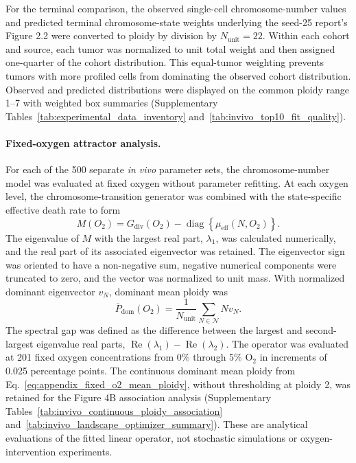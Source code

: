\documentclass[11pt]{article}
\begin{document}
For the terminal comparison, the observed single-cell chromosome-number values and predicted terminal chromosome-state weights underlying the seed-25 report's Figure 2.2 were converted to ploidy by division by \(N_{\mathrm{unit}}=22\). Within each cohort and source, each tumor was normalized to unit total weight and then assigned one-quarter of the cohort distribution. This equal-tumor weighting prevents tumors with more profiled cells from dominating the observed cohort distribution. Observed and predicted distributions were displayed on the common ploidy range 1--7 with weighted box summaries (Supplementary Tables~\ref{tab:experimental_data_inventory} and~\ref{tab:invivo_top10_fit_quality}).

\paragraph{Fixed-oxygen attractor analysis.}
For each of the 500 separate \textit{in vivo} parameter sets, the chromosome-number model was evaluated at fixed oxygen without parameter refitting. At each oxygen level, the chromosome-transition generator was combined with the state-specific effective death rate to form
\begin{equation}
M(O_2)=G_{\mathrm{div}}(O_2)-\operatorname{diag}\!\left\{\mu_{\mathrm{eff}}(N,O_2)\right\}.
\label{eq:appendix_fixed_o2_operator}
\end{equation}
The eigenvalue of $M$ with the largest real part, $\lambda_1$, was calculated numerically, and the real part of its associated eigenvector was retained. The eigenvector sign was oriented to have a non-negative sum, negative numerical components were truncated to zero, and the vector was normalized to unit mass. With normalized dominant eigenvector $v_N$, dominant mean ploidy was
\begin{equation}
\overline P_{\mathrm{dom}}(O_2)=\frac{1}{N_{\mathrm{unit}}}\sum_{N\in\mathcal N}Nv_N.
\label{eq:appendix_fixed_o2_mean_ploidy}
\end{equation}
The spectral gap was defined as the difference between the largest and second-largest eigenvalue real parts, $\operatorname{Re}(\lambda_1)-\operatorname{Re}(\lambda_2)$. The operator was evaluated at 201 fixed oxygen concentrations from 0\% through 5\% O$_2$ in increments of 0.025 percentage points. The continuous dominant mean ploidy from Eq.~\eqref{eq:appendix_fixed_o2_mean_ploidy}, without thresholding at ploidy 2, was retained for the Figure 4B association analysis (Supplementary Tables~\ref{tab:invivo_continuous_ploidy_association} and~\ref{tab:invivo_landscape_optimizer_summary}). These are analytical evaluations of the fitted linear operator, not stochastic simulations or oxygen-intervention experiments.
\end{document}

